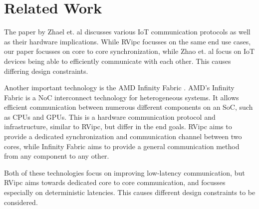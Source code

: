 \section{Related Work}
\label{sec:related_work}

The paper by Zhael et. al \cite{Zhao:IoTCommProtocols:2018} discusses various IoT communication protocols as well as their hardware implications. While RVipc focusses on the same end use cases, our paper focusses on core to core synchronization, while Zhao et. al focus on IoT devices being able to efficiently communicate with each other. This causes differing design constraints.

Another important technology is the AMD Infinity Fabric \cite{AMD:CDNA3:WhitePaper}. AMD's Infinity Fabric is a NoC interconnect technology for heterogeneous systems. It allows efficient communication between numerous different components on an SoC, such as CPUs and GPUs. This is a hardware communication protocol and infrastructure, similar to RVipc, but differ in the end goals. RVipc aims to provide a dedicated synchronization and communication channel between two cores, while Infinity Fabric aims to provide a general communication method from any component to any other.

Both of these technologies focus on improving low-latency communication, but RVipc aims towards dedicated core to core communication, and focusses especially on deterministic latencies. This causes different design constraints to be considered.
